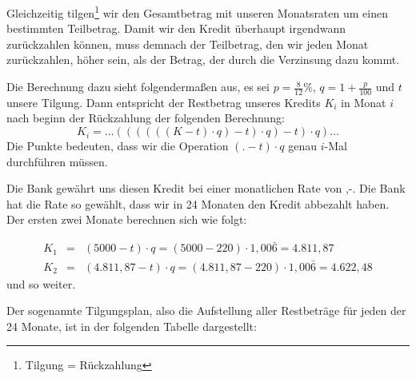 Gleichzeitig tilgen\footnote{Tilgung = Rückzahlung} wir den Gesamtbetrag mit unseren Monatsraten um einen bestimmten Teilbetrag. Damit wir den Kredit überhaupt irgendwann zurückzahlen können, muss demnach der Teilbetrag, den wir jeden Monat zurückzahlen, höher sein, als der Betrag, der durch die Verzinsung dazu kommt.

Die Berechnung dazu sieht folgendermaßen aus, es sei $p=\frac{8}{12}\% $, $q = 1+\frac{p}{100}$ und $t$ unsere Tilgung. Dann entspricht der Restbetrag unseres Kredits $K_i$ in Monat $i$ nach beginn der Rückzahlung der folgenden Berechnung:
\[
K_i = \dots ((((((K-t)\cdot q)-t)\cdot q)-t)\cdot q) \dots
\]
Die Punkte bedeuten, dass wir die Operation $(. -t)\cdot q$ genau $i$-Mal durchführen müssen.

Die Bank gewährt uns diesen Kredit bei einer monatlichen Rate von ,-. Die Bank hat die Rate so gewählt, dass wir in 24 Monaten den Kredit abbezahlt haben. Der ersten zwei Monate berechnen sich wie folgt:

\begin{eqnarray*}
K_1 &=& (5000-t)\cdot q = (5000 -220)\cdot 1,00\bar{6} = 4.811,87 \\
K_2 &=& (4.811,87 -t) \cdot q = (4.811,87 - 220)\cdot 1,00\bar{6} = 4.622,48
\end{eqnarray*}
und so weiter. 

Der sogenannte Tilgungsplan, also die Aufstellung aller Restbeträge für jeden der 24 Monate, ist in der folgenden Tabelle dargestellt:

